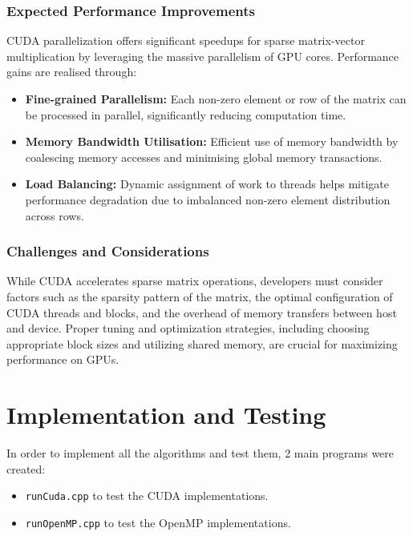 \documentclass[12pt,oneside]{book} %
\begin{document}
\subsubsection{Expected Performance Improvements}

CUDA parallelization offers significant speedups for sparse matrix-vector
multiplication by leveraging the massive parallelism of GPU cores. Performance
gains are realised through:

\begin{itemize}
    \item \textbf{Fine-grained Parallelism:} Each non-zero element or row of the matrix can be processed in parallel, significantly reducing computation time.

    \item \textbf{Memory Bandwidth Utilisation:} Efficient use of memory bandwidth by coalescing memory accesses and minimising global memory transactions.

    \item \textbf{Load Balancing:} Dynamic assignment of work to threads helps mitigate performance degradation due to imbalanced non-zero element distribution across rows.
\end{itemize}

\subsubsection{Challenges and Considerations}

While CUDA accelerates sparse matrix operations, developers must consider
factors such as the sparsity pattern of the matrix, the optimal configuration
of CUDA threads and blocks, and the overhead of memory transfers between host
and device. Proper tuning and optimization strategies, including choosing
appropriate block sizes and utilizing shared memory, are crucial for maximizing
performance on GPUs.

\newpage
\section{Implementation and Testing}

In order to implement all the algorithms and test them, 2 main programs were
created:
\begin{itemize}
    \item \texttt{runCuda.cpp} to test the CUDA implementations.
    \item \texttt{runOpenMP.cpp} to test the OpenMP implementations.
\end{itemize}
\end{document}
